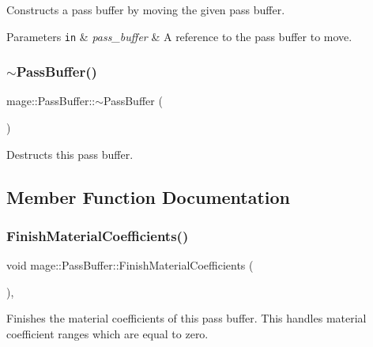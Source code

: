 Constructs a pass buffer by moving the given pass buffer.


\begin{DoxyParams}[1]{Parameters}
\mbox{\tt in}  & {\em pass\+\_\+buffer} & A reference to the pass buffer to move. \\
\hline
\end{DoxyParams}
\hypertarget{structmage_1_1_pass_buffer_a650dec579522b7d5c5810a535b10773a}{}\label{structmage_1_1_pass_buffer_a650dec579522b7d5c5810a535b10773a} 
\subsubsection{\texorpdfstring{$\sim$\+Pass\+Buffer()}{~PassBuffer()}}
{\footnotesize\ttfamily mage\+::\+Pass\+Buffer\+::$\sim$\+Pass\+Buffer (\begin{DoxyParamCaption}{ }\end{DoxyParamCaption})\hspace{0.3cm}{\ttfamily [default]}}

Destructs this pass buffer. 

\subsection{Member Function Documentation}
\hypertarget{structmage_1_1_pass_buffer_ac9b83cdfcfcf963dd230099c39a45a8f}{}\label{structmage_1_1_pass_buffer_ac9b83cdfcfcf963dd230099c39a45a8f} 
\subsubsection{\texorpdfstring{Finish\+Material\+Coefficients()}{FinishMaterialCoefficients()}}
{\footnotesize\ttfamily void mage\+::\+Pass\+Buffer\+::\+Finish\+Material\+Coefficients (\begin{DoxyParamCaption}{ }\end{DoxyParamCaption})\hspace{0.3cm}{\ttfamily [private]}, {\ttfamily [noexcept]}}

Finishes the material coefficients of this pass buffer. This handles material coefficient ranges which are equal to zero. \hypertarget{structmage_1_1_pass_buffer_a91cbe609833b84c12113c9676b9de903}{}\label{structmage_1_1_pass_buffer_a91cbe609833b84c12113c9676b9de903} 
